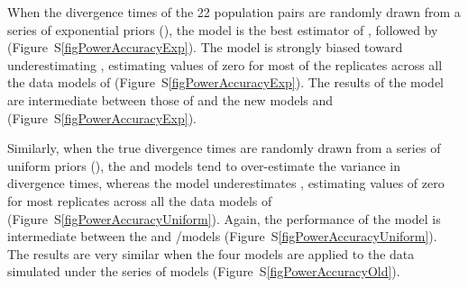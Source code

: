 When the divergence times of the 22 population pairs are randomly drawn from a
series of exponential priors (\powerSeriesExp), the \modelDPP model is the
best estimator of \divTimeDispersion, followed by \modelUniform
(Figure~S\ref{figPowerAccuracyExp}).
The \modelOld model is strongly biased toward underestimating
\divTimeDispersion, estimating values of zero for most of the replicates across
all the data models of \powerSeriesExp (Figure~S\ref{figPowerAccuracyExp}).
The results of the \modelUshaped model are intermediate between those of
\modelOld and the new models \modelDPP and \modelUniform
(Figure~S\ref{figPowerAccuracyExp}).

Similarly, when the true divergence times are randomly drawn from a series of
uniform priors (\powerSeriesUniform), the \modelDPP and \modelUniform models
tend to over-estimate the variance in divergence times, whereas the \modelOld
model underestimates \divTimeDispersion, estimating values of zero for most
replicates across all the data models of \powerSeriesUniform
(Figure~S\ref{figPowerAccuracyUniform}).
Again, the performance of the \modelUshaped model is intermediate between the
\modelOld and \modelDPP/\modelUniform models (Figure~S\ref{figPowerAccuracyUniform}).
The results are very similar when the four models are applied to the data
simulated under the \powerSeriesOld series of models
(Figure~S\ref{figPowerAccuracyOld}).

